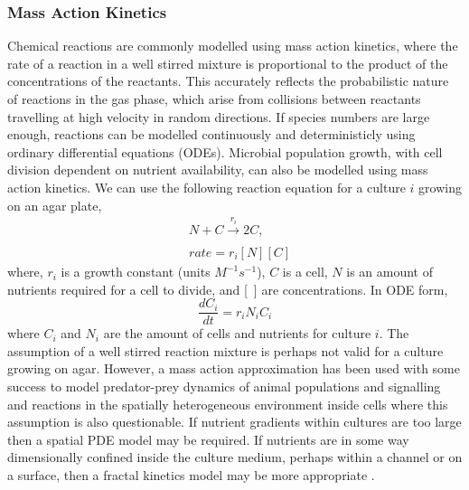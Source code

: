 \begin{multicols}{2}
\subsubsection{Mass Action Kinetics}
Chemical reactions are commonly modelled using mass action kinetics, where the rate of a
reaction in a well stirred mixture is proportional to the product of the concentrations of
the reactants. This accurately reflects the probabilistic nature of reactions in the gas
phase, which arise from collisions between reactants travelling at high velocity in random
directions. If species numbers are large enough, reactions can be modelled continuously
and deterministicly using ordinary differential equations (ODEs). Microbial population
growth, with cell division dependent on nutrient availability, can also be modelled using
mass action kinetics. We can use the following reaction equation for a culture \(i\)
growing on an agar plate,
\begin{subequations}
  \label{eq:9}
  \begin{align}
    &N + C \xrightarrow[]{r_{i}} 2C,\\
    &rate = r_{i}[N][C]
  \end{align}
\end{subequations}
where, \(r_{i}\) is a growth constant (units \(M^{-1}s^{-1}\)), \(C\) is a cell, \(N\) is an amount of nutrients
required for a cell to divide, and [~] are concentrations. In ODE form,
\begin{equation}
  \label{eq:10}
  \frac{dC_{i}}{dt} = r_{i}N_{i}C_{i}
\end{equation}
where \(C_{i}\) and \(N_{i}\) are the amount of cells and nutrients for culture \(i\).
The assumption of a well stirred reaction mixture is perhaps not valid for a culture
growing on agar. However, a mass action approximation has been used with some success to
model predator-prey dynamics of animal populations \citep{Berryman1992} and signalling and
reactions in the spatially heterogeneous environment inside cells
\citep{Aldridge2006,Chen2010} where this assumption is also questionable. If nutrient
gradients within cultures are too large then a spatial PDE model may be required. If
nutrients are in some way dimensionally confined inside the culture medium, perhaps within
a channel or on a surface, then a fractal kinetics model may be more appropriate
\citep{savageau1995}.

\end{multicols}
